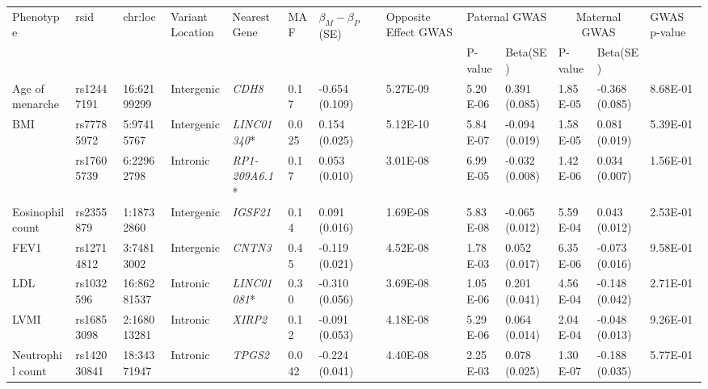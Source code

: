 \begin{table}
\centering
\begin{adjustbox}{width={\textwidth}}
\begin{tabular}{@{}p{3cm}|p{1.8cm}p{2cm}p{2cm}p{2cm}p{0.8cm}p{1.8cm}p{2.5cm}|p{1.8cm}p{1.8cm}|p{1.8cm}p{1.8cm}|p{1.8cm}@{}}
\toprule \multirow{2}{3cm}{Phenotype} & \multirow{2}{1.8cm}{rsid} & \multirow{2}{2cm}{chr:loc} & \multirow{2}{2cm}{Variant Location} & \multirow{2}{2cm}{Nearest Gene} 
& \multirow{2}{0.8cm}{MAF} & \multirow{2}{1.8cm}{$\beta_{M}-\beta_{P}$ (SE) }& \multirow{2}{2.5cm}{Opposite Effect GWAS} & \multicolumn{2}{c}{Paternal GWAS} & \multicolumn{2}{c}{Maternal GWAS} & \multirow{2}{1.8cm}{GWAS p-value}\\ \cline{9-12}
&&&&&&& & P-value & Beta(SE) & P-value & Beta(SE) &  \\ \midrule
Age of menarche & rs12447191 & 16:62199299 & Intergenic & \emph{CDH8} & 0.17	  & -0.654 (0.109)	& 5.27E-09	& 5.20E-06&	0.391 (0.085)	& 1.85E-05 & -0.368 (0.085)& 	8.68E-01\\ \hline
\multirow{2}{3cm}{BMI}& rs77785972 & 5:97415767 & Intergenic & \emph{LINC01340}* & 0.025 & 0.154 (0.025) & 5.12E-10 & 5.84E-07	 & -0.094 (0.019) & 1.58E-05 &  0.081 (0.019) & 5.39E-01\\ \cline{2-13}
&  rs17605739 & 6:22962798 & Intronic &  \emph{RP1-209A6.1}* & 0.17 & 0.053 (0.010) & 3.01E-08 & 6.99E-05 & -0.032 (0.008) & 1.42E-06 & 0.034 (0.007) & 1.56E-01\\ \hline
Eosinophil count & rs2355879 & 1:18732860 & Intergenic & \emph{IGSF21} & 0.14 & 0.091 (0.016) & 1.69E-08 & 5.83E-08  & -0.065 (0.012) & 5.59E-04 & 0.043 (0.012) & 2.53E-01 \\ \hline
FEV1 & rs12714812 & 3:74813002 & Intergenic & \emph{CNTN3} & 0.45 & -0.119 (0.021) & 4.52E-08 & 1.78E-03 & 0.052 (0.017) & 6.35E-06 & -0.073 (0.016) & 9.58E-01\\ \hline
LDL & rs1032596 & 16:86281537 & Intronic & \emph{LINC01081}* & 0.30 & -0.310 (0.056) & 3.69E-08 & 1.05E-06 & 0.201 (0.041) & 4.56E-04 & -0.148 (0.042) & 2.71E-01\\ \hline
LVMI	 & rs16853098 & 2:168013281 & Intronic & \emph{XIRP2} & 0.12 & -0.091 (0.053) & 4.18E-08 & 5.29E-06 & 0.064 (0.014) & 2.04E-04 & -0.048 (0.013) & 9.26E-01\\ \hline
Neutrophil count & rs142030841 & 18:34371947 & Intronic & \emph{TPGS2} & 0.042 & -0.224 (0.041)	 & 4.40E-08 & 2.25E-03 & 0.078 (0.025) & 1.30E-07 & -0.188 (0.035) & 5.77E-01\\ \hline

\end{tabular}
\end{adjustbox}
\end{table}
